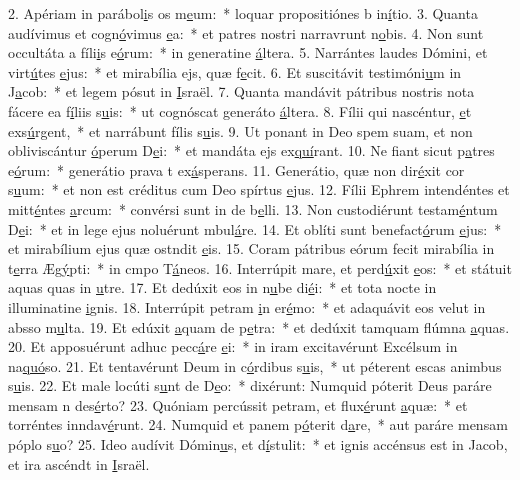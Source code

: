 2. Apériam in parábol\uline{i}s os m\uline{e}um:~* loquar propositiónes b in\uline{í}tio.
3. Quanta audívimus et cogn\uline{ó}vimus \uline{e}a:~* et patres nostri narravrunt n\uline{o}bis.
4. Non sunt occultáta a fíli\uline{i}s e\uline{ó}rum:~* in generatine \uline{á}ltera.
5. Narrántes laudes Dómini, et virt\uline{ú}tes \uline{e}jus:~* et mirabília ejs, quæ f\uline{e}cit.
6. Et suscitávit testimóni\uline{u}m in J\uline{a}cob:~* et legem pósut in \uline{I}sraël.
7. Quanta mandávit pátribus nostris nota fácere ea f\uline{í}liis s\uline{u}is:~* ut cognóscat generáto \uline{á}ltera.
8. Fílii qui nascéntur, \uline{e}t exs\uline{ú}rgent,~* et narrábunt fílis s\uline{u}is.
9. Ut ponant in Deo spem suam, et non obliviscántur \uline{ó}perum D\uline{e}i:~* et mandáta ejs ex\uline{quí}rant.
10. Ne fiant sicut p\uline{a}tres e\uline{ó}rum:~* generátio prava t ex\uline{á}sperans.
11. Generátio, quæ non dir\uline{é}xit cor s\uline{u}um:~* et non est créditus cum Deo spírtus \uline{e}jus.
12. Fílii Ephrem intendéntes et mitt\uline{é}ntes \uline{a}rcum:~* convérsi sunt in de b\uline{e}lli.
13. Non custodiérunt testam\uline{é}ntum D\uline{e}i:~* et in lege ejus noluérunt mbul\uline{á}re.
14. Et oblíti sunt benefact\uline{ó}rum \uline{e}jus:~* et mirabílium ejus quæ ostndit \uline{e}is.
15. Coram pátribus eórum fecit mirabília in t\uline{e}rra Æg\uline{ý}pti:~* in cmpo T\uline{á}neos.
16. Interrúpit mare, et perd\uline{ú}xit \uline{e}os:~* et státuit aquas quas in \uline{u}tre.
17. Et dedúxit eos in n\uline{u}be di\uline{é}i:~* et tota nocte in illuminatine \uline{i}gnis.
18. Interrúpit petram \uline{i}n er\uline{é}mo:~* et adaquávit eos velut in absso m\uline{u}lta.
19. Et edúxit \uline{a}quam de p\uline{e}tra:~* et dedúxit tamquam flúmna \uline{a}quas.
20. Et apposuérunt adhuc pecc\uline{á}re \uline{e}i:~* in iram excitavérunt Excélsum in na\uline{quó}so.
21. Et tentavérunt Deum in c\uline{ó}rdibus s\uline{u}is,~* ut péterent escas animbus s\uline{u}is.
22. Et male locúti s\uline{u}nt de D\uline{e}o:~* dixérunt: Numquid póterit Deus paráre mensam n des\uline{é}rto?
23. Quóniam percússit petram, et flux\uline{é}runt \uline{a}quæ:~* et torréntes inndav\uline{é}runt.
24. Numquid et panem p\uline{ó}terit d\uline{a}re,~* aut paráre mensam póplo s\uline{u}o?
25. Ideo audívit Dómin\uline{u}s, et d\uline{í}stulit:~* et ignis accénsus est in Jacob, et ira ascéndt in \uline{I}sraël.
